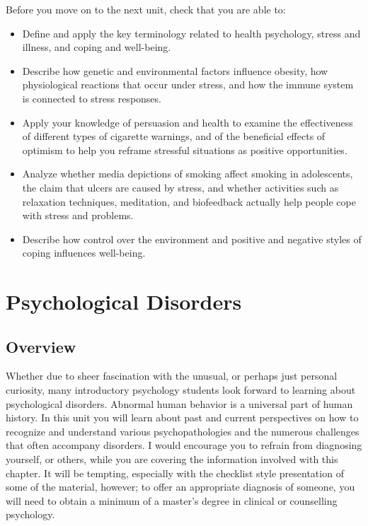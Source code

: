 \documentclass[
]{book}
\begin{document}
\begin{progress}
Before you move on to the next unit, check that you are able to:

\begin{itemize}
\item
  Define and apply the key terminology related to health psychology, stress and illness, and coping and well-being.
\item
  Describe how genetic and environmental factors influence obesity, how physiological reactions that occur under stress, and how the immune system is connected to stress responses.
\item
  Apply your knowledge of persuasion and health to examine the effectiveness of different types of cigarette warnings, and of the beneficial effects of optimism to help you reframe stressful situations as positive opportunities.
\item
  Analyze whether media depictions of smoking affect smoking in adolescents, the claim that ulcers are caused by stress, and whether activities such as relaxation techniques, meditation, and biofeedback actually help people cope with stress and problems.
\item
  Describe how control over the environment and positive and negative styles of coping influences well-being.
\end{itemize}
\end{progress}

\hypertarget{psychological-disorders}{%
\chapter{Psychological Disorders}\label{psychological-disorders}}

\hypertarget{overview-9}{%
\section*{Overview}\label{overview-9}}

Whether due to sheer fascination with the unusual, or perhaps just personal curiosity, many introductory psychology students look forward to learning about psychological disorders. Abnormal human behavior is a universal part of human history. In this unit you will learn about past and current perspectives on how to recognize and understand various psychopathologies and the numerous challenges that often accompany disorders. I would encourage you to refrain from diagnosing yourself, or others, while you are covering the information involved with this chapter. It will be tempting, especially with the checklist style presentation of some of the material, however; to offer an appropriate diagnosis of someone, you will need to obtain a minimum of a master's degree in clinical or counselling psychology.
\end{document}
